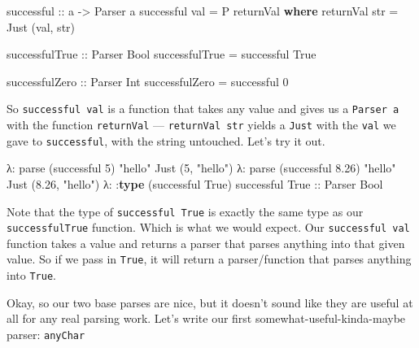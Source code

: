 \documentclass[]{article}
\newenvironment{Shaded}{}{}
\newcommand{\DataTypeTok}[1]{\textcolor[rgb]{0.56,0.13,0.00}{#1}}
\newcommand{\DecValTok}[1]{\textcolor[rgb]{0.25,0.63,0.44}{#1}}
\newcommand{\FloatTok}[1]{\textcolor[rgb]{0.25,0.63,0.44}{#1}}
\newcommand{\KeywordTok}[1]{\textcolor[rgb]{0.00,0.44,0.13}{\textbf{#1}}}
\newcommand{\NormalTok}[1]{#1}
\newcommand{\OperatorTok}[1]{\textcolor[rgb]{0.40,0.40,0.40}{#1}}
\newcommand{\OtherTok}[1]{\textcolor[rgb]{0.00,0.44,0.13}{#1}}
\newcommand{\StringTok}[1]{\textcolor[rgb]{0.25,0.44,0.63}{#1}}
\begin{document}
\begin{Shaded}
\begin{Highlighting}[]
\OtherTok{successful ::}\NormalTok{ a }\OtherTok{{-}\textgreater{}} \DataTypeTok{Parser}\NormalTok{ a}
\NormalTok{successful val }\OtherTok{=} \DataTypeTok{P}\NormalTok{ returnVal}
    \KeywordTok{where}
\NormalTok{        returnVal str }\OtherTok{=} \DataTypeTok{Just}\NormalTok{ (val, str)}

\OtherTok{successfulTrue ::} \DataTypeTok{Parser} \DataTypeTok{Bool}
\NormalTok{successfulTrue }\OtherTok{=}\NormalTok{ successful }\DataTypeTok{True}

\OtherTok{successfulZero ::} \DataTypeTok{Parser} \DataTypeTok{Int}
\NormalTok{successfulZero }\OtherTok{=}\NormalTok{ successful }\DecValTok{0}
\end{Highlighting}
\end{Shaded}

So \texttt{successful\ val} is a function that takes any value and gives us a
\texttt{Parser\ a} with the function \texttt{returnVal} ---
\texttt{returnVal\ str} yields a \texttt{Just} with the \texttt{val} we gave to
\texttt{successful}, with the string untouched. Let's try it out.

\begin{Shaded}
\begin{Highlighting}[]
\NormalTok{λ}\OperatorTok{:}\NormalTok{ parse (successful }\DecValTok{5}\NormalTok{) }\StringTok{"hello"}
\DataTypeTok{Just}\NormalTok{ (}\DecValTok{5}\NormalTok{, }\StringTok{"hello"}\NormalTok{)}
\NormalTok{λ}\OperatorTok{:}\NormalTok{ parse (successful }\FloatTok{8.26}\NormalTok{) }\StringTok{"hello"}
\DataTypeTok{Just}\NormalTok{ (}\FloatTok{8.26}\NormalTok{, }\StringTok{"hello"}\NormalTok{)}
\NormalTok{λ}\OperatorTok{:} \OperatorTok{:}\KeywordTok{type}\NormalTok{ (successful }\DataTypeTok{True}\NormalTok{)}
\NormalTok{successful }\DataTypeTok{True}\OtherTok{ ::} \DataTypeTok{Parser} \DataTypeTok{Bool}
\end{Highlighting}
\end{Shaded}

Note that the type of \texttt{successful\ True} is exactly the same type as our
\texttt{successfulTrue} function. Which is what we would expect. Our
\texttt{successful\ val} function takes a value and returns a parser that parses
anything into that given value. So if we pass in \texttt{True}, it will return a
parser/function that parses anything into \texttt{True}.

Okay, so our two base parses are nice, but it doesn't sound like they are useful
at all for any real parsing work. Let's write our first
somewhat-useful-kinda-maybe parser: \texttt{anyChar}
\end{document}
